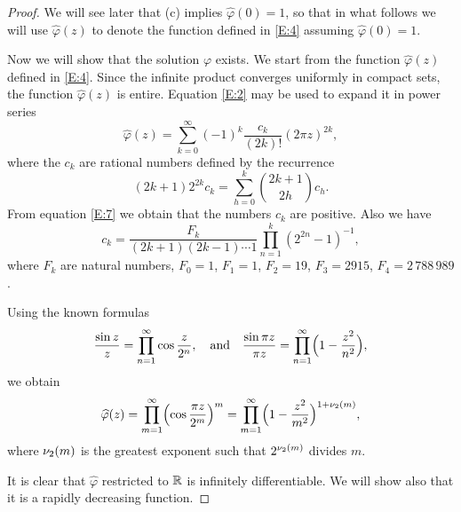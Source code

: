 \documentclass[10pt]{amsart}
\theoremstyle{definition}
\theoremstyle{remark}
\begin{document}
\begin{proof}
We will see later that (c) implies $\widehat\varphi(0)=1$, so that in what follows 
we will use $\widehat\varphi(z)$ to denote the function defined in \eqref{E:4}  assuming
$\widehat\varphi(0)=1$.

Now we will show that the solution $\varphi$ exists. We start from the function $\widehat\varphi(z)$
defined in \eqref{E:4}. Since the infinite product converges uniformly in compact sets, the function
$\widehat\varphi(z)$ is entire. Equation \eqref{E:2} may be used to expand it in power series
\begin{equation}\label{E:6}
\widehat\varphi(z)=\sum_{k=0}^\infty (-1)^k \frac{c_k}{(2k)!}(2\pi z)^{2k},
\end{equation}
where the $c_k$ are rational numbers defined by the recurrence
\begin{equation}\label{E:7}
(2k+1)2^{2k}c_k=\sum_{h=0}^k \binom{2k+1}{2h}c_h.
\end{equation}
From equation \eqref{E:7} we obtain that the numbers $c_k$ are positive. Also we have
\begin{equation}\label{E:8}
c_k=\frac{F_k}{(2k+1)(2k-1)\cdots 1}\prod_{n=1}^k (2^{2n}-1)^{-1},
\end{equation}
where $F_k$ are natural numbers, $F_0=1$, $F_1=1$, $F_2=19$, $F_3=2915$, $F_4=2\,788\,989$.

Using the known formulas
\[\frac{\sin z}{z}=\prod_{n=1}^\infty\cos\frac{z}{2^n},\quad \text{and}\quad 
\frac{\sin\pi z}{\pi z}=\prod_{n=1}^\infty \Bigl(1-\frac{z^2}{n^2}\Bigr),\]
we obtain 
\begin{equation}\label{E:9}
\widehat\varphi(z)=\prod_{m=1}^\infty \Bigl(\cos\frac{\pi z}{2^m}\Bigr)^m=\prod_{m=1}^\infty
\Bigl(1-\frac{z^2}{m^2}\Bigr)^{1+\nu_{2}(m)},
\end{equation}
where $\nu_{2}(m)$ is the greatest exponent such that
$2^{\nu_{2}(m)}$ divides $m$.

It is clear that $\widehat\varphi$ restricted to $\mathbb{R}$ is infinitely differentiable. We will
show also that it is a rapidly decreasing function. 


\end{proof}
\end{document}
